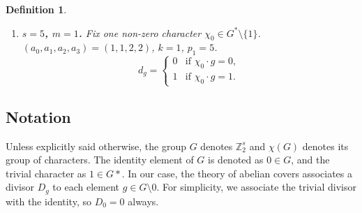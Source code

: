 \documentclass[12pt,twoside,]{amsart}
\theoremstyle{plain}
\newtheorem{definition}[theorem]{Definition}
\theoremstyle{definition}
\begin{document}
\begin{definition}
\begin{enumerate}
\begin{enumerate}
\item[(a)] $(a_0,a_1,a_2,a_3) = (1,1,2,2)$, \; $k = 1$, \; $p_1 = 5$.
\[
d_g = 
\begin{cases}
0 & \text{if } \chi_0 \cdot g = 0, \\
2 & \text{if } \chi_0 \cdot g = 1.
\end{cases}
\]

\item[(b)] $(a_0,a_1,a_2,a_3) = (1,1,2,2)$, \; $k = 1$, \; $p_1 = 5$.
\[
d_g = 
\begin{cases}
0 & \text{if } \chi_0 \cdot g = \chi_1 \cdot g = 0, \\
1 & \text{if } \chi_0 \cdot g = 0,\; \chi_1 \cdot g = 1, \\
1 & \text{if } \chi_0 \cdot g = 1,\; \chi_1 \cdot g = 0, \\
2 & \text{if } \chi_0 \cdot g = \chi_1 \cdot g = 1.
\end{cases}
\]

\item[(c)] $(a_0,a_1,a_2,a_3) = (1,1,1,1)$, \; $k = 2$, \; $p_1 = 10$.
\[
d_g = 
\begin{cases}
0, & g \in \{(0,0,0,1),\, (0,0,1,0),\, (0,0,1,1)\}, \\
1, & \text{otherwise.}
\end{cases}
\]
\end{enumerate}

\item \textbf{$s = 5$, $m = 1$.} Fix one non-zero character $\chi_0 \in G^* \setminus \{1\}$.
$(a_0,a_1,a_2,a_3) = (1,1,2,2)$, \; $k = 1$, \; $p_1 = 5$.
\[
d_g = 
\begin{cases}
0 & \text{if } \chi_0 \cdot g = 0, \\
1 & \text{if } \chi_0 \cdot g = 1.
\end{cases}
\]
\end{enumerate}
\end{definition}

\subsection{Notation}
Unless explicitly said otherwise, the group $G$ denotes $\mathbb{Z}_2^s$ and $\chi(G)$ denotes its group of characters. The identity element of $G$ is denoted as $0 \in G$, and the trivial character as $1 \in G*$. In our case, the theory of abelian covers associates a divisor $D_g$ to each element $g \in G \setminus 0$. For simplicity, we associate the trivial divisor with the identity, so $D_0 = 0$ always. 
\end{document}
